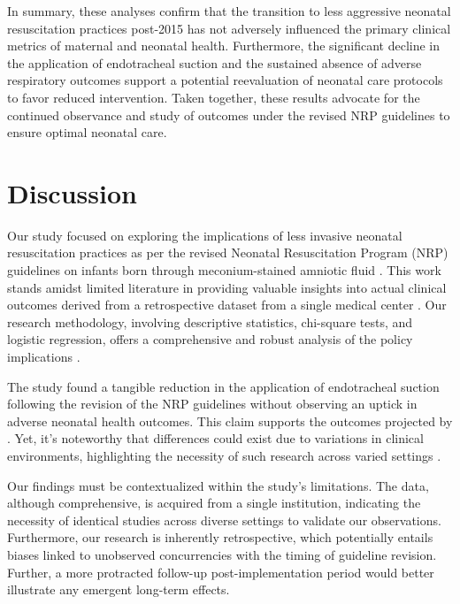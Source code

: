 \documentclass[11pt]{article}
\begin{document}
In summary, these analyses confirm that the transition to less aggressive neonatal resuscitation practices post-2015 has not adversely influenced the primary clinical metrics of maternal and neonatal health. Furthermore, the significant decline in the application of endotracheal suction and the sustained absence of adverse respiratory outcomes support a potential reevaluation of neonatal care protocols to favor reduced intervention. Taken together, these results advocate for the continued observance and study of outcomes under the revised NRP guidelines to ensure optimal neonatal care.

\section*{Discussion}

Our study focused on exploring the implications of less invasive neonatal resuscitation practices as per the revised Neonatal Resuscitation Program (NRP) guidelines on infants born through meconium-stained amniotic fluid \cite{Wiswell2000DeliveryRM, Singh2004EndofLifeAB, Breatnach2010APC}. This work stands amidst limited literature \cite{Pados2020SystematicRO,Liu2002DeliveryRR} in providing valuable insights into actual clinical outcomes derived from a retrospective dataset from a single medical center \cite{Sweet2023EuropeanCG, Course2020ManagementOR, Lee2016ReductionOB}. Our research methodology, involving descriptive statistics, chi-square tests, and logistic regression, offers a comprehensive and robust analysis of the policy implications \cite{Rochwerg2017OfficialEC}. 

The study found a tangible reduction in the application of endotracheal suction following the revision of the NRP guidelines without observing an uptick in adverse neonatal health outcomes. This claim supports the outcomes projected by \cite{Oommen2020ResuscitationON}. Yet, it's noteworthy that differences could exist due to variations in clinical environments, highlighting the necessity of such research across varied settings \cite{Sweet2023EuropeanCG}. 

Our findings must be contextualized within the study's limitations. The data, although comprehensive, is acquired from a single institution, indicating the necessity of identical studies across diverse settings to validate our observations. Furthermore, our research is inherently retrospective, which potentially entails biases linked to unobserved concurrencies with the timing of guideline revision. Further, a more protracted follow-up post-implementation period would better illustrate any emergent long-term effects.
\end{document}
